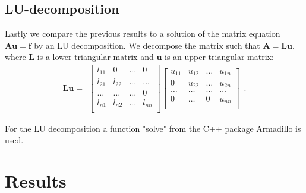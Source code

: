 \documentclass{emulateapj}
\begin{document}
%


\subsection{LU-decomposition}
Lastly we compare the previous results to a solution of the matrix equation $\boldsymbol{Au} = \boldsymbol{f}$ by an LU decomposition. We decompose the matrix such that $\boldsymbol{A} = \boldsymbol{L u}$, where $\boldsymbol{L}$ is a lower triangular matrix and $\boldsymbol{u}$ is an upper triangular matrix:
%
\[ \boldsymbol{Lu} =
\begin{array}{c}
\begin{bmatrix}\label{eq:A = Lu}
l_{11}     & 0                 &\dots       & 0 \\
l_{21}     & l_{22}              & \dots      & \dots       \\
\dots       & \dots              & \dots      & 0    \\
 l_{n1} &  l_{n2}                   & \dots      & l_{nn}     \\
\end{bmatrix}
\begin{bmatrix}
u_{11}     & u_{12}                  & \dots       & u_{1n} \\
0     & u_{22}                & \dots      & u_{2n}       \\
\dots       & \dots             & \dots      & \dots    \\
 0 &  \dots                 & 0      & u_{nn}     \\
\end{bmatrix}
\end{array}.
\]
%

For the LU decomposition a function "solve" from the C++ package Armadillo is used.

\section{Results}

\end{document}
